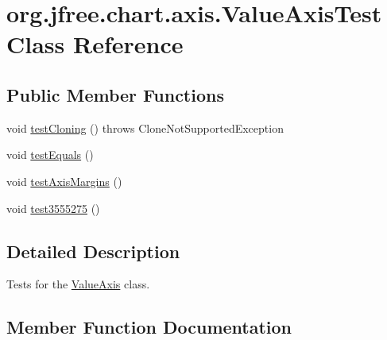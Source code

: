 \hypertarget{classorg_1_1jfree_1_1chart_1_1axis_1_1_value_axis_test}{}\section{org.\+jfree.\+chart.\+axis.\+Value\+Axis\+Test Class Reference}
\label{classorg_1_1jfree_1_1chart_1_1axis_1_1_value_axis_test}
\subsection*{Public Member Functions}
\begin{DoxyCompactItemize}
\item 
void \mbox{\hyperlink{classorg_1_1jfree_1_1chart_1_1axis_1_1_value_axis_test_ab0b133a873d573747114fde80502e825}{test\+Cloning}} ()  throws Clone\+Not\+Supported\+Exception 
\item 
void \mbox{\hyperlink{classorg_1_1jfree_1_1chart_1_1axis_1_1_value_axis_test_a1b6d092a0a5bc4f547cff09dbe79906a}{test\+Equals}} ()
\item 
void \mbox{\hyperlink{classorg_1_1jfree_1_1chart_1_1axis_1_1_value_axis_test_aecc99febb2b06f39cb5856cc347b0049}{test\+Axis\+Margins}} ()
\item 
void \mbox{\hyperlink{classorg_1_1jfree_1_1chart_1_1axis_1_1_value_axis_test_a08b24d7ec8556246dfc46669d58f9ada}{test3555275}} ()
\end{DoxyCompactItemize}


\subsection{Detailed Description}
Tests for the \mbox{\hyperlink{classorg_1_1jfree_1_1chart_1_1axis_1_1_value_axis}{Value\+Axis}} class. 

\subsection{Member Function Documentation}
\mbox{\label{classorg_1_1jfree_1_1chart_1_1axis_1_1_value_axis_test_a08b24d7ec8556246dfc46669d58f9ada}} 

